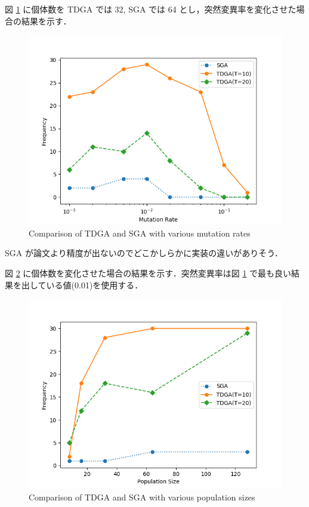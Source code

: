 \documentclass[onecolumn]{ujarticle}   %
\begin{document}
	図 \ref{fig:variousmute} に個体数を TDGA では 32, SGA では 64 とし，突然変異率を変化させた場合の結果を示す．

	\begin{figure}[h]
		\vspace{-20mm}
		\begin{center}
			\includegraphics[width=0.7\columnwidth]{figure/exp_mut.png}
			\caption{Comparison of TDGA and SGA with various mutation rates}
			\label{fig:variousmute}
		\end{center}
	\end{figure}

	SGA が論文より精度が出ないのでどこかしらかに実装の違いがありそう．

	図 \ref{fig:variousNp} に個体数を変化させた場合の結果を示す．突然変異率は図 \ref{fig:variousmute} で最も良い結果を出している値(0.01)を使用する．

	\begin{figure}[h]
		\begin{center}
			\includegraphics[width=0.7\columnwidth]{figure/exp_Np.png}
			\caption{Comparison of TDGA and SGA with various population sizes}
			\label{fig:variousNp}
		\end{center}
	\end{figure}
\end{document}
